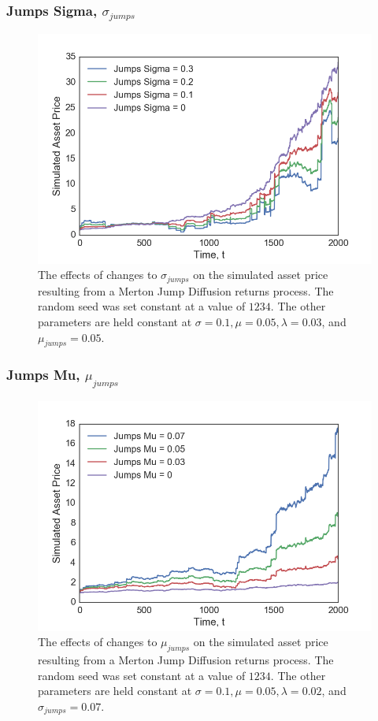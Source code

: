 \documentclass[11pt,oneside,openany,a4paper,english, report, goldenblock
]{usthesis}
\begin{document}
\subsubsection{Jumps Sigma, $\sigma_{jumps}$}

\begin{figure}[h]
	\centering
	\includegraphics[width=0.7\linewidth]{Images/Parameter-Effects/Effects_Jumps_Sigma}
	\caption[The effects of changes to $\sigma_{jumps}$ on the Merton Jump Diffusion returns process]{The effects of changes to $\sigma_{jumps}$ on the simulated asset price resulting from a Merton Jump Diffusion returns process. The random seed was set constant at a value of $1234$. The other parameters are held constant at $\sigma=0.1, \mu=0.05, \lambda=0.03$, and $\mu_{jumps}=0.05$.}
	\label{fig:effects_jumps_sigma}
\end{figure}

\newpage
\subsubsection{Jumps Mu, $\mu_{jumps}$}

\begin{figure}[h]
	\centering
	\includegraphics[width=0.7\linewidth]{Images/Parameter-Effects/Effects_Jumps_Mu}
	\caption[The effects of changes to $\mu_{jumps}$ on the Merton Jump Diffusion returns process]{The effects of changes to $\mu_{jumps}$ on the simulated asset price resulting from a Merton Jump Diffusion returns process. The random seed was set constant at a value of $1234$. The other parameters are held constant at $\sigma=0.1, \mu=0.05, \lambda=0.02$, and $\sigma_{jumps}=0.07$.}
	\label{fig:effects_jumps_mu}
\end{figure}
\end{document}
